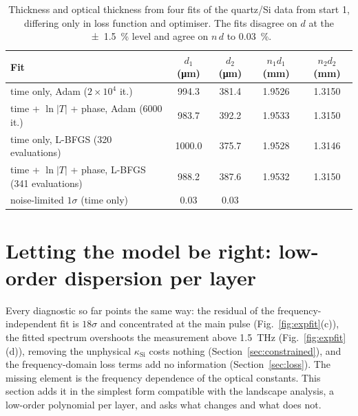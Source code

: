 \documentclass{optica-article}
\newcommand{\kap}{\kappa}
\begin{document}
\begin{table}[htb]\centering\small
  \caption{Thickness and optical thickness from four fits of the quartz/Si data from start 1, differing only in loss function and optimiser. The fits disagree on $d$ at the \SI{\pm1.5}{\percent} level and agree on $n\,d$ to \SI{0.03}{\percent}.}
  \label{tab:nd}
  \begin{tabular}{l cc cc}\toprule
    Fit & $d_1$ (\si{\micro\metre}) & $d_2$ (\si{\micro\metre}) & $n_1d_1$ (\si{\milli\metre}) & $n_2d_2$ (\si{\milli\metre})\\\midrule
    time only, Adam ($2\times10^4$ it.) & 994.3 & 381.4 & 1.9526 & 1.3150\\
    time + $\ln|T|$ + phase, Adam (6000 it.) & 983.7 & 392.2 & 1.9533 & 1.3150\\
    time only, L-BFGS (320 evaluations) & 1000.0 & 375.7 & 1.9528 & 1.3146\\
    time + $\ln|T|$ + phase, L-BFGS (341 evaluations) & 988.2 & 387.6 & 1.9532 & 1.3150\\\midrule
    noise-limited $1\sigma$ (time only) & 0.03 & 0.03 & & \\
    \bottomrule
  \end{tabular}
\end{table}

\section{Letting the model be right: low-order dispersion per layer}\label{sec:disp}
Every diagnostic so far points the same way: the residual of the frequency-independent fit is $18\sigma$ and concentrated at the main pulse (Fig.~\ref{fig:expfit}(c)), the fitted spectrum overshoots the measurement above \SI{1.5}{THz} (Fig.~\ref{fig:expfit}(d)), removing the unphysical $\kap_{\mathrm{Si}}$ costs nothing (Section~\ref{sec:constrained}), and the frequency-domain loss terms add no information (Section~\ref{sec:loss}). The missing element is the frequency dependence of the optical constants. This section adds it in the simplest form compatible with the landscape analysis, a low-order polynomial per layer, and asks what changes and what does not.
\end{document}
